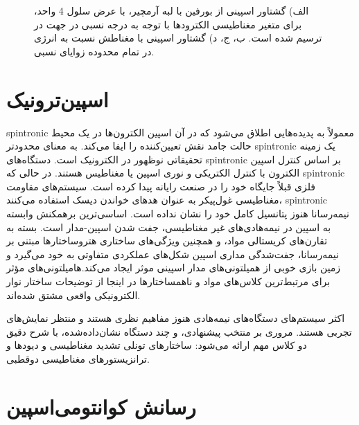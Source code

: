 \begin{figure}[!ht]
  \begin{latin}
    \centering
    \resizebox{0.45\textwidth}{!}{}
    \resizebox{0.45\textwidth}{!}{}
    \resizebox{0.45\textwidth}{!}{}
    \resizebox{0.45\textwidth}{!}{}
  \end{latin}
    \caption{الف) گشتاور اسپینی از ‌بورفین با لبه آرمچیر، با عرض سلول 4 واحد، برای متغیر مغناطیسی الکترودها با توجه به درجه نسبی در جهت  در  ترسیم شده است. ب، ج، د) گشتاور اسپینی با مغناطش  نسبت به انرژی در تمام محدوده زوایای نسبی.}
    \label{fig:stt}
\end{figure}


\section{اسپین‌ترونیک}
\gls{spintronic} معمولاً به پدیده‌هایی اطلاق ‌می‌‌شود که در آن اسپین الکترون‌ها در یک محیط حالت جامد نقش تعیین‌کننده را ایفا ‌می‌‌کند. به معنای محدودتر \gls{spintronic} یک ز‌مینه تحقیقاتی نوظهور در الکترونیک است. دستگاه‌های \gls{spintronic} بر اساس کنترل اسپین الکترون با کنترل الکتریکی و نوری اسپین یا مغناطیس هستند. در حالی که \gls{spintronic} فلزی قبلاً جایگاه خود را در صنعت رایانه پیدا کرده است. سیستم‌های مقاومت مغناطیسی غول‌پیکر به عنوان هدهای خواندن دیسک استفاده ‌می‌‌کنند، \gls{spintronic} نیمه‌رسانا هنوز پتانسیل کامل خود را نشان نداده است. اساسی‌ترین برهمکنش وابسته به اسپین در نیمه‌هادی‌های غیر مغناطیسی، جفت شدن اسپین-مدار است. بسته به تقارن‌های کریستالی مواد، و همچنین ویژگی‌های ساختاری هتروساختارها مبتنی بر نیمه‌رسانا، جفت‌شدگی مداری اسپین شکل‌های عملکردی متفاوتی به خود ‌می‌‌گیرد و ز‌مین بازی خوبی از همیلتونی‌های مدار اسپینی موثر ایجاد ‌می‌‌کند.‌ها‌میلتونی‌های مؤثر برای مرتبط‌ترین کلاس‌های مواد و ناهمساختارها در اینجا از توضیحات ساختار نوار الکترونیکی واقعی مشتق شده‌اند. 

اکثر سیستم‌های دستگاه‌های نیمه‌هادی هنوز مفاهیم نظری هستند و منتظر نمایش‌های تجربی هستند. مروری بر منتخب پیشنهادی، و چند دستگاه نشان‌داده‌شده، با شرح دقیق دو کلاس مهم ارائه ‌می‌‌شود: ساختارهای تونلی تشدید مغناطیسی و دیودها و ترانزیستورهای مغناطیسی دوقطبی.

\section{رسانش کوانتو‌‌می‌‌اسپین}

